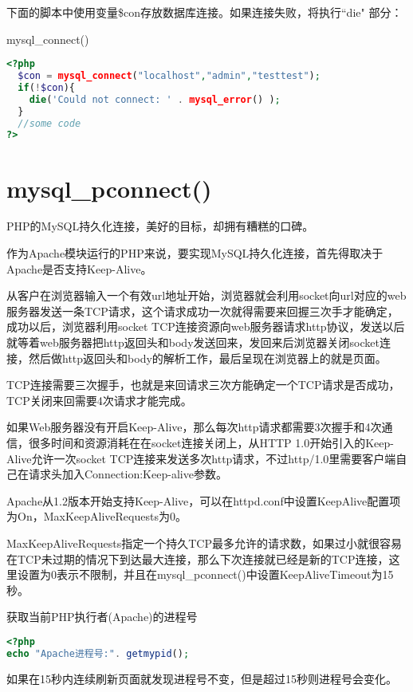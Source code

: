 下面的脚本中使用变量\$con存放数据库连接。如果连接失败，将执行``die" 部分：

\begin{example}
mysql\_connect()
\begin{lstlisting}[language=PHP]
<?php
  $con = mysql_connect("localhost","admin","testtest");
  if(!$con){
    die('Could not connect: ' . mysql_error() );
  }
  //some code
?>
\end{lstlisting}
\end{example}

\section{mysql\_pconnect()}

PHP的MySQL持久化连接，美好的目标，却拥有糟糕的口碑。

作为Apache模块运行的PHP来说，要实现MySQL持久化连接，首先得取决于Apache是否支持Keep-Alive。

从客户在浏览器输入一个有效url地址开始，浏览器就会利用socket向url对应的web服务器发送一条TCP请求，这个请求成功一次就得需要来回握三次手才能确定，成功以后，浏览器利用socket TCP连接资源向web服务器请求http协议，发送以后就等着web服务器把http返回头和body发送回来，发回来后浏览器关闭socket连接，然后做http返回头和body的解析工作，最后呈现在浏览器上的就是页面。


TCP连接需要三次握手，也就是来回请求三次方能确定一个TCP请求是否成功，TCP关闭来回需要4次请求才能完成。

如果Web服务器没有开启Keep-Alive，那么每次http请求都需要3次握手和4次通信，很多时间和资源消耗在在socket连接关闭上，从HTTP 1.0开始引入的Keep-Alive允许一次socket TCP连接来发送多次http请求，不过http/1.0里需要客户端自己在请求头加入Connection:Keep-alive参数。

Apache从1.2版本开始支持Keep-Alive，可以在httpd.conf中设置KeepAlive配置项为On，MaxKeepAliveRequests为0。

MaxKeepAliveRequests指定一个持久TCP最多允许的请求数，如果过小就很容易在TCP未过期的情况下到达最大连接，那么下次连接就已经是新的TCP连接，这里设置为0表示不限制，并且在mysql\_pconnect()中设置KeepAliveTimeout为15秒。

\begin{example}
获取当前PHP执行者(Apache)的进程号
\begin{lstlisting}[language=PHP]
<?php
echo "Apache进程号:". getmypid();
\end{lstlisting}
\end{example}

如果在15秒内连续刷新页面就发现进程号不变，但是超过15秒则进程号会变化。

